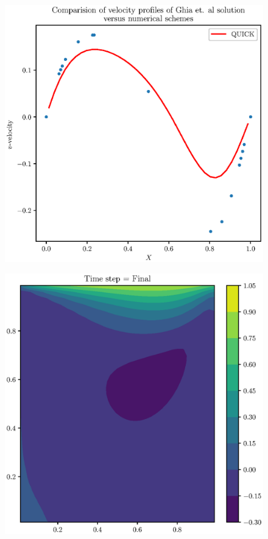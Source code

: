 \documentclass[12pt,a4paper,fleqn]{article}
\begin{document}
\begin{figure}[H]
    \centering
    \includegraphics[width=\textwidth]{n,xy=40_qk_cavityFlowX.eps}
    \label{fig:n,xy=40_qk_cavityFlowX.eps}
\end{figure}

\begin{figure}[H]
    \centering
    \includegraphics[width=\textwidth]{n,xy=40_qk_uContours.eps}
    \label{fig:n,xy=40_qk_uContours.eps}
\end{figure}
\end{document}
